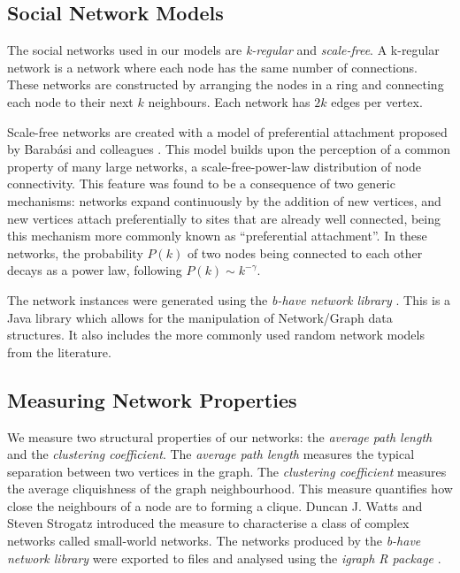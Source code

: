 \documentclass[preprint,number]{elsarticle}
\begin{document}
\subsection{Social Network Models}
\label{sec:exp-setup_network_models}
The social networks used in our models are \textit{k-regular} and \textit{scale-free}. A k-regular network is a network where each node has the same number of connections. These networks are constructed by arranging the nodes in a ring and connecting each node to their next $k$ neighbours. Each network has $2k$ edges per vertex. 

Scale-free networks \cite{Barabasi1999} are created with a model of preferential attachment proposed by Barab\'{a}si and colleagues \cite{Barabasi1999}. This model builds upon the perception of a common property of many large networks, a scale-free-power-law distribution of node connectivity. This feature was found to be a consequence of two generic mechanisms: networks expand continuously by the addition of new vertices, and new vertices attach preferentially to sites that are already well connected, being this mechanism more commonly known as ``preferential attachment''. In these networks, the probability $P(k)$ of two nodes being connected to each other decays as a power law, following $P(k) \sim k^{- \gamma}$.

The network instances were generated using the \textit{b-have network library} \cite{Nunes:Software:11069}. This is a Java library which allows for the manipulation of Network/Graph data structures. It also includes the more commonly used random network models from the literature. 

\subsection{Measuring Network Properties}
We measure two structural properties of our networks: the \textit{average path length} and the \textit{clustering coefficient}. The \textit{average path length} measures the typical separation between two vertices in the graph. The \textit{clustering coefficient} measures the average cliquishness of the graph neighbourhood. This measure quantifies how close the neighbours of a node are to forming a clique. Duncan J. Watts and Steven Strogatz \cite{Watts1998} introduced the measure to characterise a class of complex networks called small-world networks. The networks produced by the \textit{b-have network library} \cite{Nunes:Software:11069} were exported to files and analysed using the \textit{igraph R package} \cite{igraph2006}. 
\end{document}
